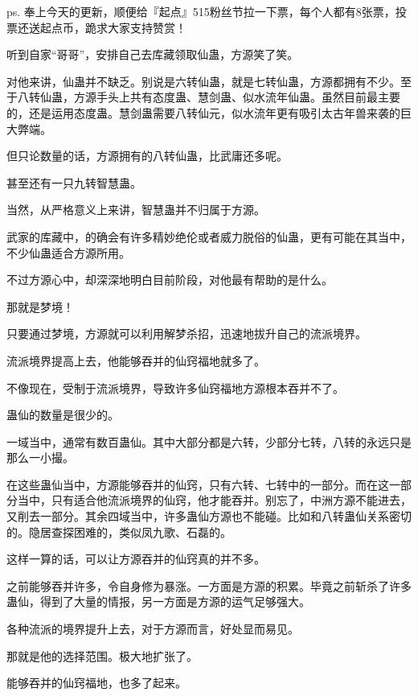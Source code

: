
\begin{this_body}



ps. 奉上今天的更新，顺便给『起点』515粉丝节拉一下票，每个人都有8张票，投票还送起点币，跪求大家支持赞赏！

听到自家“哥哥”，安排自己去库藏领取仙蛊，方源笑了笑。

对他来讲，仙蛊并不缺乏。别说是六转仙蛊，就是七转仙蛊，方源都拥有不少。至于八转仙蛊，方源手头上共有态度蛊、慧剑蛊、似水流年仙蛊。虽然目前最主要的，还是运用态度蛊。慧剑蛊需要八转仙元，似水流年更有吸引太古年兽来袭的巨大弊端。

但只论数量的话，方源拥有的八转仙蛊，比武庸还多呢。

甚至还有一只九转智慧蛊。

当然，从严格意义上来讲，智慧蛊并不归属于方源。

武家的库藏中，的确会有许多精妙绝伦或者威力脱俗的仙蛊，更有可能在其当中，不少仙蛊适合方源所用。

不过方源心中，却深深地明白目前阶段，对他最有帮助的是什么。

那就是梦境！

只要通过梦境，方源就可以利用解梦杀招，迅速地拔升自己的流派境界。

流派境界提高上去，他能够吞并的仙窍福地就多了。

不像现在，受制于流派境界，导致许多仙窍福地方源根本吞并不了。

蛊仙的数量是很少的。

一域当中，通常有数百蛊仙。其中大部分都是六转，少部分七转，八转的永远只是那么一小撮。

在这些蛊仙当中，方源能够吞并的仙窍，只有六转、七转中的一部分。而在这一部分当中，只有适合他流派境界的仙窍，他才能吞并。别忘了，中洲方源不能进去，又削去一部分。其余四域当中，许多蛊仙方源也不能碰。比如和八转蛊仙关系密切的。隐居查探困难的，类似凤九歌、石磊的。

这样一算的话，可以让方源吞并的仙窍真的并不多。

之前能够吞并许多，令自身修为暴涨。一方面是方源的积累。毕竟之前斩杀了许多蛊仙，得到了大量的情报，另一方面是方源的运气足够强大。

各种流派的境界提升上去，对于方源而言，好处显而易见。

那就是他的选择范围。极大地扩张了。

能够吞并的仙窍福地，也多了起来。


\end{this_body}
